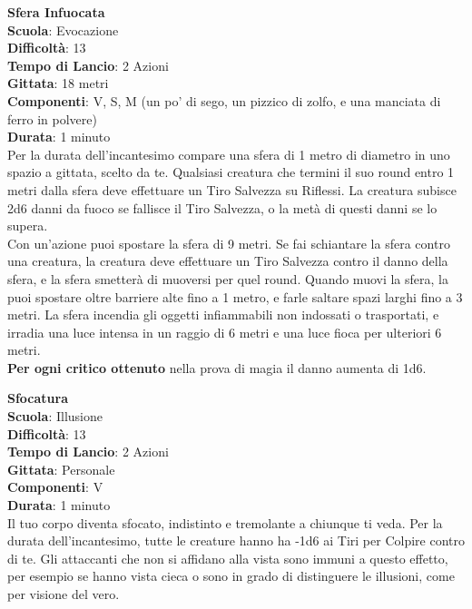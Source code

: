 \begin{multicols}{2}
\medskip\textbf{Sfera Infuocata}\\
\textbf{Scuola}: Evocazione\\
\textbf{Difficoltà}:  13\\
\textbf{Tempo di Lancio}: 2 Azioni\\
\textbf{Gittata}: 18 metri\\
\textbf{Componenti}: V, S, M (un po’ di sego, un pizzico di zolfo, e una manciata di ferro in polvere)\\
\textbf{Durata}: 1 minuto\\
Per la durata dell'incantesimo compare una sfera di 1 metro  di diametro in uno spazio a gittata, scelto da te. Qualsiasi creatura che termini il suo round entro 1 metri dalla sfera deve effettuare un Tiro Salvezza su Riflessi. La creatura subisce 2d6 danni da fuoco se fallisce il Tiro Salvezza, o la metà di questi danni se lo supera.\\
Con un'azione puoi spostare la sfera di 9 metri. Se fai schiantare la sfera contro una creatura, la creatura deve effettuare un Tiro Salvezza contro il danno della sfera, e la sfera smetterà di muoversi per quel round.
Quando muovi la sfera, la puoi spostare oltre barriere alte fino a 1 metro, e farle saltare spazi larghi fino a 3 metri. La sfera incendia gli oggetti infiammabili non indossati o trasportati, e irradia una luce intensa in un  raggio di 6 metri e una luce fioca per ulteriori 6 metri.\\
\textbf{Per ogni critico ottenuto} nella prova di magia il danno aumenta di 1d6.

\medskip\textbf{Sfocatura}\\
\textbf{Scuola}: Illusione\\
\textbf{Difficoltà}:  13\\
\textbf{Tempo di Lancio}: 2 Azioni\\
\textbf{Gittata}: Personale\\
\textbf{Componenti}: V\\
\textbf{Durata}: 1 minuto \\
Il tuo corpo diventa sfocato, indistinto e tremolante a chiunque ti veda. Per la durata dell'incantesimo, tutte le creature hanno ha -1d6 ai Tiri per Colpire contro di te. Gli attaccanti che non si affidano alla vista sono immuni a questo effetto, per esempio se hanno vista cieca o sono in grado di distinguere le illusioni, come per visione del vero.


\end{multicols}
